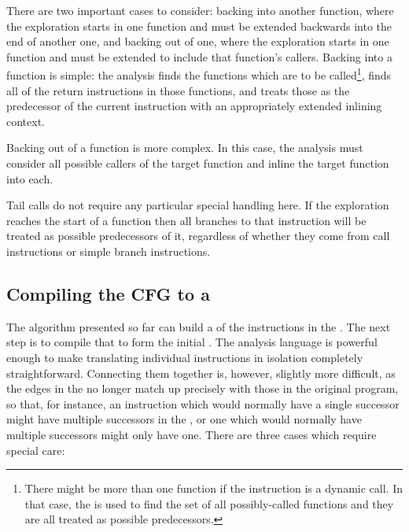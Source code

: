 There are two important cases to consider: backing into another
function, where the exploration starts in one function and must be
extended backwards into the end of another one, and backing out of
one, where the exploration starts in one function and must be extended
to include that function's callers.  Backing into a function is
simple: the analysis finds the functions which are to be
called\footnote{There might be more than one function if the
  instruction is a dynamic call.  In that case, the  is used to find the set of all possibly-called functions
  and they are all treated as possible predecessors.}, finds all of
the return instructions in those functions, and treats those as the
predecessor of the current instruction with an appropriately extended
inlining context.

Backing out of a function is more complex.  In this case, the analysis
must consider all possible callers of the target function and inline
the target function into each.  


Tail calls do not require any particular special handling here.  If
the exploration reaches the start of a function then all branches to
that instruction will be treated as possible predecessors of it,
regardless of whether they come from call instructions or simple
branch instructions.

\subsection{Compiling the CFG to a \StateMachine}
\label{sect:derive:compile_cfg}


The algorithm presented so far can build a  of the
instructions in the .  The next step is to
compile that  to form the initial {\StateMachine}.  The
{\StateMachine} analysis language is powerful enough to make
translating individual instructions in isolation completely
straightforward.  Connecting them together is, however, slightly more
difficult, as the edges in the  no longer match up
precisely with those in the original program, so that, for instance,
an instruction which would normally have a single successor might have
multiple successors in the , or one which would normally
have multiple successors might only have one.  There are three cases
which require special care:

